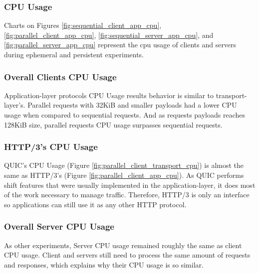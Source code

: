 \subsubsection{CPU Usage}

Charts on Figures \ref{fig:sequential_client_app_cpu}, \ref{fig:parallel_client_app_cpu}, \ref{fig:sequential_server_app_cpu}, and \ref{fig:parallel_server_app_cpu} represent the \gls{cpu} usage of clients and servers during ephemeral and persistent experiments.

\subsubsection*{Overall Clients CPU Usage}

Application-layer protocols CPU Usage results behavior is similar to transport-layer's. Parallel requests with 32KiB and smaller payloads had a lower CPU usage when compared to sequential requests. And as requests payloads reaches 128KiB size, parallel requests CPU usage surpasses sequential requests.

\subsubsection*{HTTP/3's CPU Usage}

QUIC's CPU Usage (Figure \ref{fig:parallel_client_transport_cpu}) is almost the same as HTTP/3's (Figure \ref{fig:parallel_client_app_cpu}). As QUIC performs shift features that were usually implemented in the application-layer, it does most of the work necessary to manage traffic. Therefore, HTTP/3 is only an interface so applications can still use it as any other HTTP protocol.

\subsubsection*{Overall Server CPU Usage}

As other experiments, Server CPU usage remained roughly the same as client CPU usage. Client and servers still need to process the same amount of requests and responses, which explains why their CPU usage is so similar.

\clearpage

